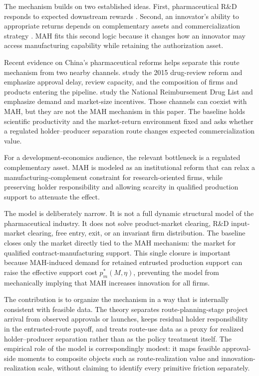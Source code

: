 \documentclass[12pt]{article}
\newcommand{\1}{\mathbf{1}}
\begin{document}
The mechanism builds on two established ideas. First, pharmaceutical R\&D responds to expected downstream rewards \citep{Schmookler1966,AcemogluLinn2004,Finkelstein2004,DuboisDeMouzonScottMortonSeabright2015,BudishRoinWilliams2015}. Second, an innovator's ability to appropriate returns depends on complementary assets and commercialization strategy \citep{Teece1986,AroraFosfuriGambardella2001,GansStern2003}. MAH fits this second logic because it changes how an innovator may access manufacturing capability while retaining the authorization asset.

Recent evidence on China's pharmaceutical reforms helps separate this route mechanism from two nearby channels. \citet{JiaMaYangZhang2023} study the 2015 drug-review reform and emphasize approval delay, review capacity, and the composition of firms and products entering the pipeline. \citet{BarwickXiaXia2026} study the National Reimbursement Drug List and emphasize demand and market-size incentives. Those channels can coexist with MAH, but they are not the MAH mechanism in this paper. The baseline holds scientific productivity and the market-return environment fixed and asks whether a regulated holder--producer separation route changes expected commercialization value.

For a development-economics audience, the relevant bottleneck is a regulated complementary asset. MAH is modeled as an institutional reform that can relax a manufacturing-complement constraint for research-oriented firms, while preserving holder responsibility and allowing scarcity in qualified production support to attenuate the effect.

The model is deliberately narrow. It is not a full dynamic structural model of the pharmaceutical industry. It does not solve product-market clearing, R\&D input-market clearing, free entry, exit, or an invariant firm distribution. The baseline closes only the market directly tied to the MAH mechanism: the market for qualified contract-manufacturing support. This single closure is important because MAH-induced demand for retained entrusted production support can raise the effective support cost $p_m^*(M,\eta)$, preventing the model from mechanically implying that MAH increases innovation for all firms.

The contribution is to organize the mechanism in a way that is internally consistent with feasible data. The theory separates route-planning-stage project arrival from observed approvals or launches, keeps residual holder responsibility in the entrusted-route payoff, and treats route-use data as a proxy for realized holder--producer separation rather than as the policy treatment itself. The empirical role of the model is correspondingly modest: it maps feasible approval-side moments to composite objects such as route-realization value and innovation-realization scale, without claiming to identify every primitive friction separately.
\end{document}
